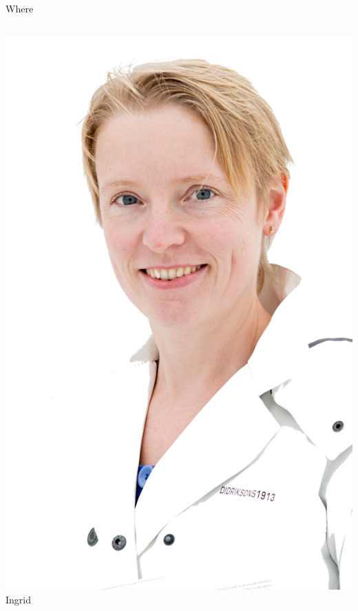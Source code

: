 \documentclass[12pt,table,t]{beamer}
\begin{document}
\begin{frame}{Where}
\begin{columns}[c]
    \begin{center}
      \includegraphics[width=\linewidth]{figure/ingrid} \\
      Ingrid
    \end{center}


\end{columns}
\end{frame}
\end{document}
